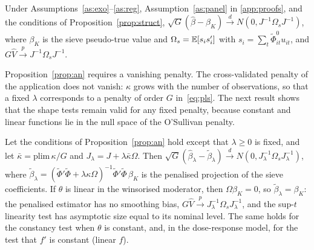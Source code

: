 \documentclass[preprint,12pt,authoryear]{elsarticle}
\begin{document}
\begin{proposition}\label{prop:an}
Under Assumptions~\ref{as:exo}--\ref{as:reg}, Assumption~\ref{as:panel} in \ref{app:proofs}, and the conditions of Proposition~\ref{prop:struct}, $\sqrt G(\hat\beta-\beta_K)\xrightarrow{d}N(0,J^{-1}\Omega_s J^{-1})$, where $\beta_K$ is the sieve pseudo-true value and $\Omega_s=\mathbb{E}[s_is_i']$ with $s_i=\sum_t\tilde\Phi^0_{it}u_{it}$, and $G\hat V\xrightarrow{p}J^{-1}\Omega_s J^{-1}$.
\end{proposition}

Proposition~\ref{prop:an} requires a vanishing penalty. The cross-validated penalty of the application does not vanish: $\kappa$ grows with the number of observations, so that a fixed $\lambda$ corresponds to a penalty of order $G$ in~\eqref{eq:pls}. The next result shows that the shape tests remain valid for any fixed penalty, because constant and linear functions lie in the null space of the O'Sullivan penalty.

\begin{proposition}\label{prop:null}
Let the conditions of Proposition~\ref{prop:an} hold except that $\lambda\ge0$ is fixed, and let $\bar\kappa=\mathrm{plim}\,\kappa/G$ and $J_\lambda=J+\lambda\bar\kappa\Omega$. Then $\sqrt G(\hat\beta_\lambda-\tilde\beta_\lambda)\xrightarrow{d}N(0,J_\lambda^{-1}\Omega_sJ_\lambda^{-1})$, where $\tilde\beta_\lambda=(\tilde\Phi'\tilde\Phi+\lambda\kappa\Omega)^{-1}\tilde\Phi'\tilde\Phi\,\beta_K$ is the penalised projection of the sieve coefficients. If $\theta$ is linear in the winsorised moderator, then $\Omega\beta_K=0$, so $\tilde\beta_\lambda=\beta_K$: the penalised estimator has no smoothing bias, $G\hat V\xrightarrow{p}J_\lambda^{-1}\Omega_sJ_\lambda^{-1}$, and the sup-$t$ linearity test has asymptotic size equal to its nominal level. The same holds for the constancy test when $\theta$ is constant, and, in the dose-response model, for the test that $f'$ is constant (linear $f$).
\end{proposition}
\end{document}
